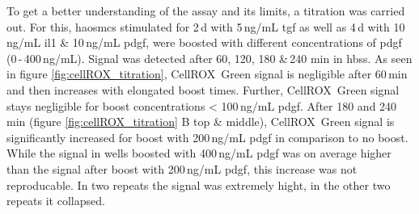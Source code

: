     To get a better understanding of the assay and its limits, a titration was carried out. For this, \acp{haosmc} stimulated for 2\,d with 5\,ng/mL \ac{tgf} as well as 4\,d with 10\,ng/mL  \ac{il1} \& 10\,ng/mL  \ac{pdgf}, were boosted with different concentrations of \ac{pdgf} (0\,-\,400\,ng/mL). Signal was detected after 60, 120, 180 \&\,240 min in \ac{hbss}. As seen in figure \ref{fig:cellROX_titration}, CellROX\texttrademark~Green signal is negligible after 60\,min and then increases with elongated boost times. Further, CellROX\texttrademark~Green signal stays negligible for boost concentrations < 100\,ng/mL \ac{pdgf}. After 180 and 240\,min (figure \ref{fig:cellROX_titration} B top \& middle), CellROX\texttrademark~Green signal is significantly increased for boost with 200\,ng/mL \ac{pdgf} in comparison to no boost. While the signal in wells boosted with 400\,ng/mL \ac{pdgf} was on average higher than the signal after boost with 200\,ng/mL \ac{pdgf}, this increase was not reproducable. In two repeats the signal was extremely hight, in the other two repeats it collapsed.


